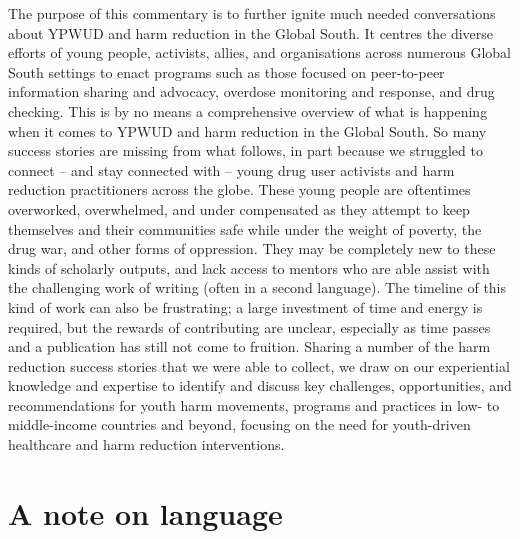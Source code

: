 \documentclass[
  letterpaper,
  DIV=11,
  numbers=noendperiod]{scrartcl}
\begin{document}
The purpose of this commentary is to further ignite much needed
conversations about YPWUD and harm reduction in the Global South. It
centres the diverse efforts of young people, activists, allies, and
organisations across numerous Global South settings to enact programs
such as those focused on peer-to-peer information sharing and advocacy,
overdose monitoring and response, and drug checking. This is by no means
a comprehensive overview of what is happening when it comes to YPWUD and
harm reduction in the Global South. So many success stories are missing
from what follows, in part because we struggled to connect -- and stay
connected with -- young drug user activists and harm reduction
practitioners across the globe. These young people are oftentimes
overworked, overwhelmed, and under compensated as they attempt to keep
themselves and their communities safe while under the weight of poverty,
the drug war, and other forms of oppression. They may be completely new
to these kinds of scholarly outputs, and lack access to mentors who are
able assist with the challenging work of writing (often in a second
language). The timeline of this kind of work can also be frustrating; a
large investment of time and energy is required, but the rewards of
contributing are unclear, especially as time passes and a publication
has still not come to fruition. Sharing a number of the harm reduction
success stories that we were able to collect, we draw on our
experiential knowledge and expertise to identify and discuss key
challenges, opportunities, and recommendations for youth harm movements,
programs and practices in low- to middle-income countries and beyond,
focusing on the need for youth-driven healthcare and harm reduction
interventions.

\section{A note on language}\label{sec-language}
\end{document}
